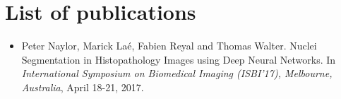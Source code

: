\documentclass[a4paper,10pt,twocolumn]{article}
\begin{document}
\clearpage



\section*{List of publications}

\begin{itemize}
\item Peter Naylor, Marick Laé, Fabien Reyal and Thomas Walter. Nuclei Segmentation in Histopathology Images using Deep Neural Networks. In \textit{International Symposium on Biomedical Imaging (ISBI'17), Melbourne, Australia}, April 18-21, 2017.
\end{itemize}
\end{document}
